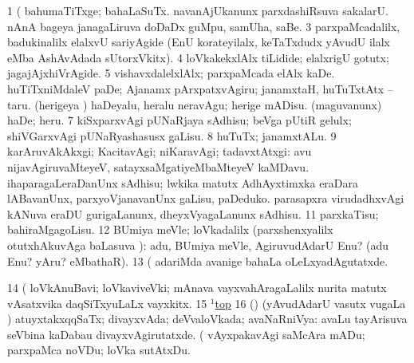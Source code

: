 \noindent
\gl{\pagu}
\expl{}
\bmng
\bnum
\num{1}  (  bahumaTiTxge; bahaLaSuTx. 
  
\banum
{} navanAjUkanunx parxdashiRsuva sakalarU. 
 nAnA bageya janagaLiruva doDaDx guMpu, samUha, saBe. 
\eanum
\numie
\num{3}  parxpaMcadalilx, badukinalilx elalxvU sariyAgide (EnU korateyilalx, keTaTxdudx yAvudU ilalx eMba AshAvAdada sUtorxVkitx). 
\num{4}  loVkakekxlAlx tiLidide; elalxrigU gotutx; jagajAjxhiVrAgide. 
\num{5}  vishavxdalelxlAlx; parxpaMcada elAlx kaDe. 
  
\banum
{} huTiTxniMdaleV paDe; Ajanamx pArxpatxvAgiru; janamxtaH, huTuTxtAtx -- taru. 
 (herigeya \vi) haDeyalu, heralu neravAgu; herige mADisu. 
 (maguvanunx) haDe; heru. 
\eanum
\numie
\num{7}  kiSxparxvAgi pUNaRjaya sAdhisu; beVga pUtiR gelulx; shiVGarxvAgi pUNaRyashasusx gaLisu. 
\num{8}  huTuTx; janamxtALu. 
\num{9}    karAruvAkAkxgi; KacitavAgi; niKaravAgi; tadavxtAtxgi:  avu nijavAgiruvaMteyeV, satayxsaMgatiyeMbaMteyeV kaMDavu. 
  
\banum
{} ihaparagaLeraDanUnx sAdhisu; lwkika matutx AdhAyxtimxka eraDara lABavanUnx, parxyoVjanavanUnx gaLisu, paDeduko. 
 parasapxra virudadhxvAgi kANuva eraDU gurigaLanunx, dheyxVyagaLanunx sAdhisu. 
\eanum
\numie
\num{11}  parxkaTisu; bahiraMgagoLisu. 
\num{12}  BUmiya meVle; loVkadalilx (parxshenxyalilx otutxhAkuvAga baLasuva \pagu):  adu, BUmiya meVle, AgiruvudAdarU Enu? (adu Enu? yAru? eMbathaR). 
\num{13}  (  adariMda avanige bahaLa oLeLxyadAgutatxde. 
\num{14}  (  loVkAnuBavi; loVkaviveVki; mAnava vayxvahAragaLalilx nurita matutx vAsatxvika daqSiTxyuLaLx vayxkitx. 
\num{15}  \hyperref{kandict_t.pdf}{T}{top(1) pagu(6)}{$^1$top}  
\num{16}  (\AmA) (yAvudAdarU vasutx \mo vugaLa \vi) atuyxtakxqqSaTx; divayxvAda; deVvaloVkada; avaNaRniVya:  avaLu tayArisuva seVbina kaDabau divayxvAgirutatxde. 
  (  
\banum
{} vAyxpakavAgi saMcAra mADu; parxpaMca noVDu; loVka sutAtxDu. 
